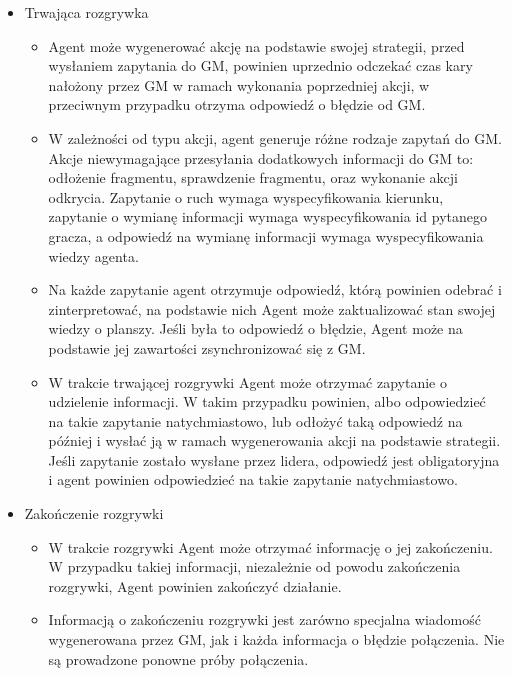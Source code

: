 \documentclass[../Dokumentacja.tex]{subfiles}
\begin{document}
\begin{itemize}
    \item Trwająca rozgrywka
    \begin{itemize}
        \item Agent może wygenerować akcję na podstawie swojej strategii, przed wysłaniem zapytania do GM, powinien uprzednio odczekać czas kary nałożony przez GM w ramach wykonania poprzedniej akcji, w przeciwnym przypadku otrzyma odpowiedź o błędzie od GM.
        \item W zależności od typu akcji, agent generuje różne rodzaje zapytań do GM. Akcje niewymagające przesyłania dodatkowych informacji do GM to: odłożenie fragmentu, sprawdzenie fragmentu, oraz wykonanie akcji odkrycia. Zapytanie o ruch wymaga wyspecyfikowania kierunku, zapytanie o wymianę informacji wymaga wyspecyfikowania id pytanego gracza, a odpowiedź na wymianę informacji wymaga wyspecyfikowania wiedzy agenta.
        \item Na każde zapytanie agent otrzymuje odpowiedź, którą powinien odebrać i zinterpretować, na podstawie nich Agent może zaktualizować stan swojej wiedzy o planszy. Jeśli była to odpowiedź o błędzie, Agent może na podstawie jej zawartości zsynchronizować się z GM.
        \item W trakcie trwającej rozgrywki Agent może otrzymać zapytanie o udzielenie informacji. W takim przypadku powinien, albo odpowiedzieć na takie zapytanie natychmiastowo, lub odłożyć taką odpowiedź na później i wysłać ją w ramach wygenerowania akcji na podstawie strategii. Jeśli zapytanie zostało wysłane przez lidera, odpowiedź jest obligatoryjna i agent powinien odpowiedzieć na takie zapytanie natychmiastowo.
    \end{itemize}
    \item Zakończenie rozgrywki
    \begin{itemize}
        \item W trakcie rozgrywki Agent może otrzymać informację o jej zakończeniu. W przypadku takiej informacji, niezależnie od powodu zakończenia rozgrywki, Agent powinien zakończyć działanie.
        \item Informacją o zakończeniu rozgrywki jest zarówno specjalna wiadomość wygenerowana przez GM, jak i każda informacja o błędzie połączenia. Nie są prowadzone ponowne próby połączenia.
    \end{itemize}
\end{itemize}
\end{document}
